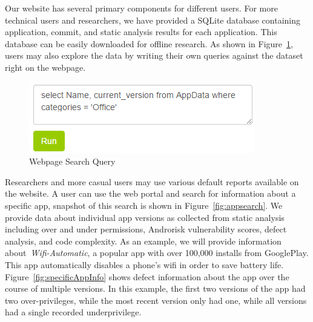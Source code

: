 
Our website has several primary components for different users. For more technical users and researchers, we have provided a SQLite database containing application, commit, and static analysis results for each application. This database can be easily downloaded for offline research. As shown in Figure~\ref{fig:webpagequery}, users may also explore the data by writing their own queries against the dataset right on the webpage.

\begin{figure}[ht!]
\centering
\includegraphics[width=\columnwidth, angle = 0, scale=.8]{images/webpageQuery.png}
\caption{Webpage Search Query}
\label{fig:webpagequery}
\end{figure}




Researchers and more casual users may use various default reports available on the website. A user can use the web portal and  search  for information about a specific app, snapshot of this search is shown in Figure~\ref{fig:appsearch}. We provide data about individual app versions as collected from static analysis including over and under permissions, Androrisk vulnerability scores, defect analysis, and code complexity. As an example, we will provide information about~\emph{Wifi-Automatic}\cite{wifi_automatic_GH}, a popular app with over 100,000 installs from GooglePlay. This app automatically disables a phone's wifi in order to save battery life. Figure~\ref{fig:specificAppInfo} shows defect information about the app over the course of multiple versions. In this example, the first two versions of the app had two over-privileges, while the most recent version only had one, while all versions had a single recorded underprivilege.





